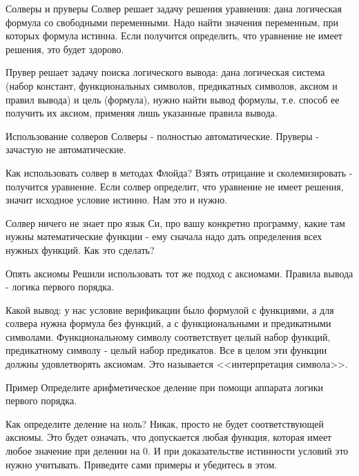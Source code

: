 \documentclass[hyperref={unicode=true}]{beamer}
\begin{document}
    \begin{frame}{Солверы и пруверы}
    Солвер решает задачу решения уравнения: дана логическая формула со
    свободными переменными. Надо найти значения переменным, при которых
    формула истинна. Если получится определить, что уравнение не имеет решения,
    это будет здорово.

    Прувер решает задачу поиска логического вывода: дана логическая система
    (набор констант, функциональных символов, предикатных символов, аксиом и
     правил вывода) и цель (формула), нужно найти вывод формулы, т.е. способ
    ее получить их аксиом, применяя лишь указанные правила вывода.
    \end{frame}

    \begin{frame}{Использование солверов}
    Солверы - полностью автоматические. Пруверы - зачастую не автоматические.

    Как использовать солвер в методах Флойда? Взять отрицание и сколемизировать
    - получится уравнение. Если солвер определит, что уравнение не имеет решения,
    значит исходное условие истинно. Нам это и нужно.

    Солвер ничего не знает про язык Си, про вашу конкретно программу, какие
    там нужны математические функции - ему сначала надо дать определения всех
    нужных функций. Как это сделать?
    \end{frame}

    \begin{frame}{Опять аксиомы}
    Решили использовать тот же подход с аксиомами. Правила вывода - логика
    первого порядка.

    Какой вывод: у нас условие верификации было формулой с функциями, а для
    солвера нужна формула без функций, а с функциональными и предикатными
    символами. Функциональному символу соответствует целый набор функций,
    предикатному символу - целый набор предикатов. Все в целом эти функции
    должны удовлетворять аксиомам. Это называется <<интерпретация символа>>.
    \end{frame}

    \begin{frame}{Пример}
    Определите арифметическое деление при помощи аппарата логики первого порядка.

    Как определите деление на ноль? Никак, просто не будет соответствующей
    аксиомы. Это будет означать, что допускается любая функция, которая имеет
    любое значение при делении на 0. И при доказательстве истинности условий
    это нужно учитывать. Приведите сами примеры и убедитесь в этом.
    \end{frame}
\end{document}
